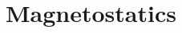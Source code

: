 \documentclass[../book.tex]{subfiles}
\begin{document}
\chapter{Magnetostatics}
\label{ch:magnetostatics}














\chapterbib
\end{document}

